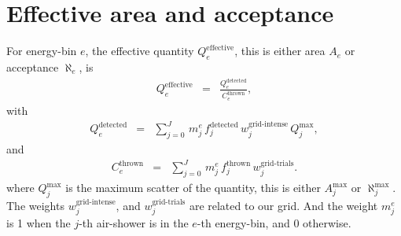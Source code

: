 \documentclass[a4paper,12pt,oneside]{article}
\def\WeightGridTrials{w^\text{grid-trials}}
\def\WeightGridSuccesses{w^\text{grid-intense}}
\begin{document}
\section{Effective area and acceptance}
\label{SecEffectiveQuantity}
%
For energy-bin $e$, the effective quantity $Q^\text{effective}_e$, this is either area $A_e$ or acceptance $\aleph_e$, is
%
\begin{eqnarray}
Q^\text{effective}_e &=& \frac{Q^\text{detected}_e}{C^\text{thrown}_e},
\label{EqEffectiveQuantity}
\end{eqnarray}
%
with
\begin{eqnarray*}
Q^\text{detected}_e &=& \sum_{j=0}^J\,m^e_j\,f^\text{detected}_j\,\WeightGridSuccesses_j\,Q^\text{max}_j,
\end{eqnarray*}
%
and
%
\begin{eqnarray*}
C^\text{thrown}_e &=& \sum_{j=0}^J\,m^e_j\,f^\text{thrown}_j\,\WeightGridTrials_j.
\end{eqnarray*}
%
where $Q^\text{max}_j$ is the maximum scatter of the quantity, this is either $A^\text{max}_j$ or $\aleph^\text{max}_j$.
%
The weights $\WeightGridSuccesses_j$, and $\WeightGridTrials_j$ are related to our grid.
%
And the weight $m^e_j$ is 1 when the $j$-th air-shower is in the $e$-th energy-bin, and 0 otherwise.
%
%

\end{document}
